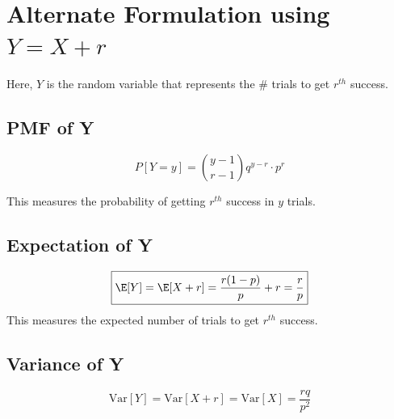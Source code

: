 \section{Alternate Formulation using \(Y=X+r\)}
\label{sec:alternate-formulation-using-y-x-r-}

Here, \(Y\) is the random variable that represents the \(\#\) trials to get
\(r^{th}\) success.

\subsection{PMF of Y}
\label{ssec:pmf-of-y-nbd}

\begin{equation}
  \label{eqn:pmf-of-y-nbd}
  \boxed{P[Y=y] = \binom{y-1}{r-1}q^{y-r}\cdot p^{r}}
\end{equation}

This measures the probability of getting \(r^{th}\) success in \(y\) trials.

\subsection{Expectation of Y}
\label{ssec:expectation-of-y-nbd}

\begin{equation}
  \label{eqn:expectation-of-y-nbd}
  \boxed{\E[Y]=\E[X+r]=\frac{r(1-p)}{p}+r = \frac{r}{p}}
\end{equation}
This measures the expected number of trials to get \(r^{th}\) success.

\subsection{Variance of Y}
\label{ssec:variance-of-y-nbd}

\begin{equation}
  \label{eqn:variance-of-y-nbd}
  \boxed{\text{Var}[Y] = \text{Var}[X+r]= \text{Var}[X]  = \frac{rq}{p^2}}
\end{equation}
